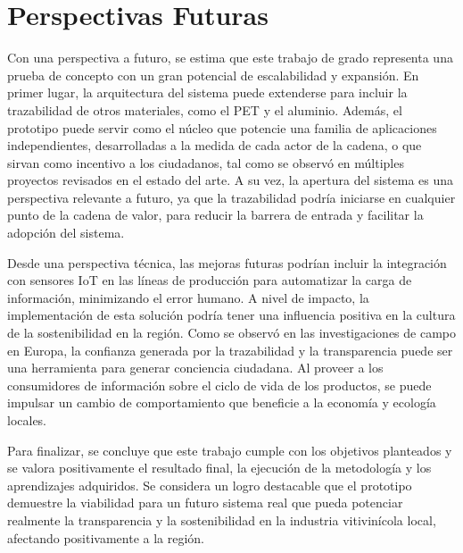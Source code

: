 \section{Perspectivas Futuras}

Con una perspectiva a futuro, se estima que este trabajo de grado representa una prueba de concepto con un gran potencial de escalabilidad y expansión. En primer lugar, la arquitectura del sistema puede extenderse para incluir la trazabilidad de otros materiales, como el PET y el aluminio. Además, el prototipo puede servir como el núcleo que potencie una familia de aplicaciones independientes, desarrolladas a la medida de cada actor de la cadena, o que sirvan como incentivo a los ciudadanos, tal como se observó en múltiples proyectos revisados en el estado del arte. A su vez, la apertura del sistema es una perspectiva relevante a futuro, ya que la trazabilidad podría iniciarse en cualquier punto de la cadena de valor, para reducir la barrera de entrada y facilitar la adopción del sistema.

Desde una perspectiva técnica, las mejoras futuras podrían incluir la integración con sensores IoT en las líneas de producción para automatizar la carga de información, minimizando el error humano. A nivel de impacto, la implementación de esta solución podría tener una influencia positiva en la cultura de la sostenibilidad en la región. Como se observó en las investigaciones de campo en Europa, la confianza generada por la trazabilidad y la transparencia puede ser una herramienta para generar conciencia ciudadana. Al proveer a los consumidores de información sobre el ciclo de vida de los productos, se puede impulsar un cambio de comportamiento que beneficie a la economía y ecología locales.

Para finalizar, se concluye que este trabajo cumple con los objetivos planteados y se valora positivamente el resultado final, la ejecución de la metodología y los aprendizajes adquiridos. Se considera un logro destacable que el prototipo demuestre la viabilidad para un futuro sistema real que pueda potenciar realmente la transparencia y la sostenibilidad en la industria vitivinícola local, afectando positivamente a la región.

